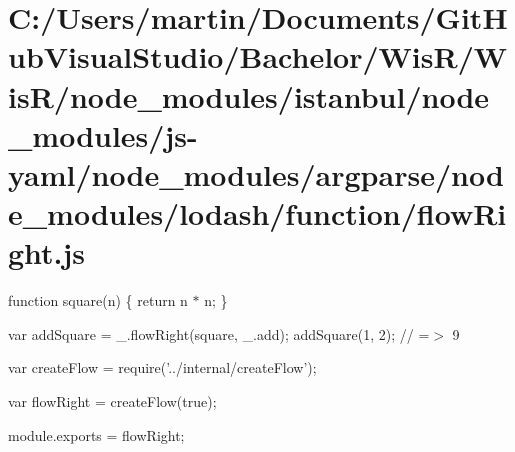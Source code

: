 \hypertarget{_c_1_2_users_2martin_2_documents_2_git_hub_visual_studio_2_bachelor_2_wis_r_2_wis_r_2node_module8d9c272d8d1adcee929356faebaf8265}{}\section{C\+:/\+Users/martin/\+Documents/\+Git\+Hub\+Visual\+Studio/\+Bachelor/\+Wis\+R/\+Wis\+R/node\+\_\+modules/istanbul/node\+\_\+modules/js-\/yaml/node\+\_\+modules/argparse/node\+\_\+modules/lodash/function/flow\+Right.\+js}
function square(n) \{ return n $\ast$ n; \}

var add\+Square = \+\_\+.\+flow\+Right(square, \+\_\+.\+add); add\+Square(1, 2); // =$>$ 9


\begin{DoxyCodeInclude}
var createFlow = require(\textcolor{stringliteral}{'../internal/createFlow'});

var flowRight = createFlow(\textcolor{keyword}{true});

module.exports = flowRight;
\end{DoxyCodeInclude}
 